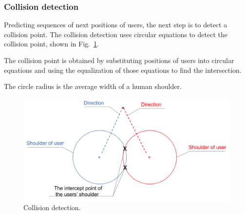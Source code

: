 







\newpage
\subsubsection{Collision detection}
Predicting sequences of next positions of users, the next step is to detect a collision point. The collision detection uses circular equations to detect the collision point, shown in Fig.~\ref{fig:Collision detection}.

The collision point is obtained by substituting positions of users into circular equations and using the equalization of those equations to find the intersection.

The circle radius is the average width of a human shoulder.



\begin{figure}[H]\centering
	\includegraphics[width=1.0\textwidth]{Pictures/Collision detection_edited.png}%
	\caption{Collision detection.}\label{fig:Collision detection}%
\end{figure}


